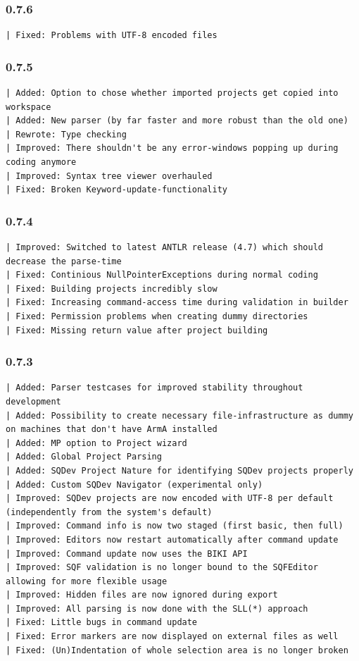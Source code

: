 \documentclass[twoside=false]{scrbook}
\begin{document}
	\subsubsection*{0.7.6}
	\begin{lstlisting}[breaklines=true]
| Fixed: Problems with UTF-8 encoded files
	\end{lstlisting}
	
	\subsubsection*{0.7.5}
	\begin{lstlisting}[breaklines=true]
| Added: Option to chose whether imported projects get copied into workspace
| Added: New parser (by far faster and more robust than the old one)
| Rewrote: Type checking
| Improved: There shouldn't be any error-windows popping up during coding anymore
| Improved: Syntax tree viewer overhauled
| Fixed: Broken Keyword-update-functionality
	\end{lstlisting}
	
	\subsubsection*{0.7.4}
	\begin{lstlisting}[breaklines=true]
| Improved: Switched to latest ANTLR release (4.7) which should decrease the parse-time
| Fixed: Continious NullPointerExceptions during normal coding
| Fixed: Building projects incredibly slow
| Fixed: Increasing command-access time during validation in builder
| Fixed: Permission problems when creating dummy directories
| Fixed: Missing return value after project building
	\end{lstlisting}
	
	\subsubsection*{0.7.3}
	\begin{lstlisting}[breaklines=true]
| Added: Parser testcases for improved stability throughout development
| Added: Possibility to create necessary file-infrastructure as dummy on machines that don't have ArmA installed
| Added: MP option to Project wizard
| Added: Global Project Parsing
| Added: SQDev Project Nature for identifying SQDev projects properly
| Added: Custom SQDev Navigator (experimental only)
| Improved: SQDev projects are now encoded with UTF-8 per default (independently from the system's default)
| Improved: Command info is now two staged (first basic, then full)
| Improved: Editors now restart automatically after command update
| Improved: Command update now uses the BIKI API
| Improved: SQF validation is no longer bound to the SQFEditor allowing for more flexible usage
| Improved: Hidden files are now ignored during export
| Improved: All parsing is now done with the SLL(*) approach
| Fixed: Little bugs in command update
| Fixed: Error markers are now displayed on external files as well
| Fixed: (Un)Indentation of whole selection area is no longer broken
	\end{lstlisting}
	
\end{document}
